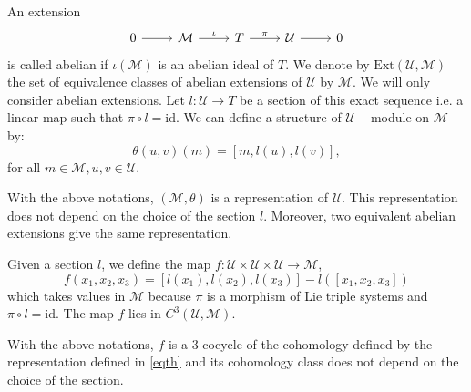 \documentclass[11pt, twoside]{article}
\begin{document}
An extension \[\begin{tikzcd}
	0 & \mathcal{M} & T & {\mathcal{U}} & 0
	\arrow[from=1-1, to=1-2]
	\arrow["\iota", from=1-2, to=1-3]
	\arrow["\pi", from=1-3, to=1-4]
	\arrow[from=1-4, to=1-5]
\end{tikzcd}\] is called abelian if $\iota(\mathcal{M}) $ is an abelian ideal of $T$. We denote by $\mathrm{Ext}(\mathcal{U},\mathcal{M}) $ the set of equivalence classes of abelian extensions of $\mathcal{U} $ by $\mathcal{M}$. We will only consider abelian extensions. Let $l:\mathcal{U}\to T$ be a section of this exact sequence i.e. a linear map such that $\pi\circ l=\mathrm{id}$. We can define a structure of $\mathcal{U}- $module on $\mathcal{M}$ by: \begin{equation}\label{eqth}
    \theta(u,v)(m)= [m,l(u),l(v)],
\end{equation} for all $m\in \mathcal{M}, u,v\in \mathcal{U}$.

\begin{lem}\cite{Z14}
    With the above notations, $(\mathcal{M},\theta) $ is a representation of $\mathcal{U} $. This representation does not depend on the choice of the section $l$. Moreover, two equivalent abelian extensions give the same representation. 
\end{lem}

Given a section $l$, we define the map $f:\mathcal{U}\times\mathcal{U}\times \mathcal{U}\to \mathcal{M} $, $$f(x_1,x_2,x_3)= [l(x_1),l(x_2),l(x_3)]-l([x_1,x_2,x_3]) $$ which takes values in $\mathcal{M}$ because $\pi$ is a morphism of Lie triple systems and $\pi\circ l=\mathrm{id} $. The map $f$ lies in $C^3(\mathcal{U},\mathcal{M}) $. 

\begin{lem}\cite{Y60}
    With the above notations, $f $ is a $3$-cocycle of the cohomology defined by the representation defined in \eqref{eqth} and its cohomology class does not depend on the choice of the section.
\end{lem}
\end{document}

